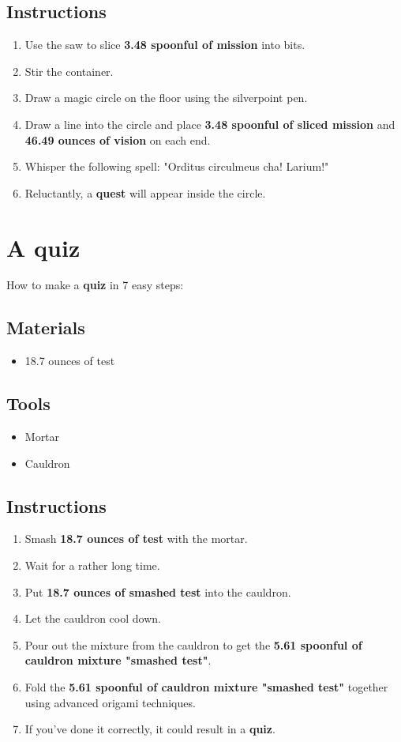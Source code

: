 \documentclass{article}
\begin{document}
\subsection{Instructions}\begin{enumerate}
\item 
Use the saw to slice \textbf{3.48 spoonful of mission} into bits.
\item 
Stir the container.
\item 
Draw a magic circle on the floor using the silverpoint pen.
\item 
Draw a line into the circle and place \textbf{3.48 spoonful of sliced mission} and \textbf{46.49 ounces of vision} on each end.
\item 
Whisper the following spell: "Orditus circulmeus cha! Larium!"
\item 
Reluctantly, a \textbf{quest} will appear inside the circle.
\end{enumerate}
\newpage
\section{A quiz}How to make a \textbf{quiz} in 7 easy steps:

\subsection{Materials}\begin{itemize}
\item 
18.7 ounces of test
\end{itemize}
\subsection{Tools}\begin{itemize}
\item 
Mortar
\item 
Cauldron
\end{itemize}
\subsection{Instructions}\begin{enumerate}
\item 
Smash \textbf{18.7 ounces of test} with the mortar.
\item 
Wait for a rather long time.
\item 
Put \textbf{18.7 ounces of smashed test} into the cauldron.
\item 
Let the cauldron cool down.
\item 
Pour out the mixture from the cauldron to get the \textbf{5.61 spoonful of cauldron mixture "smashed test"}.
\item 
Fold the \textbf{5.61 spoonful of cauldron mixture "smashed test"} together using advanced origami techniques.
\item 
If you've done it correctly, it could result in a \textbf{quiz}.
\end{enumerate}
\newpage
\end{document}
